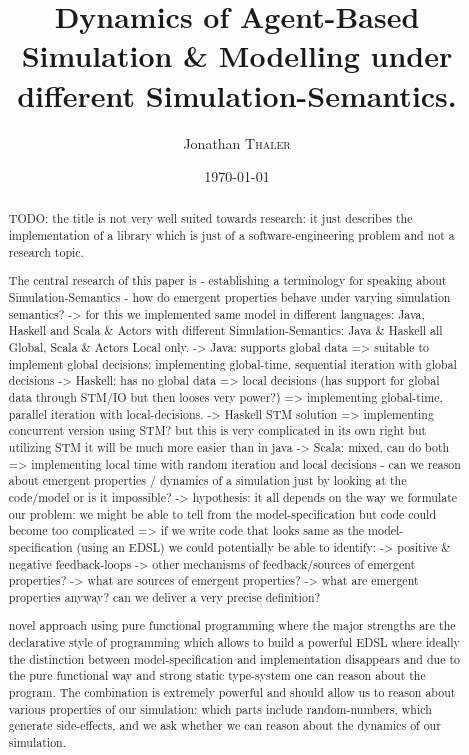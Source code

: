 \documentclass{article}
\title{Dynamics of Agent-Based Simulation \& Modelling under different Simulation-Semantics.} %
\author{Jonathan \textsc{Thaler}} %
\date{\today} %
\begin{document}
\maketitle %

\begin{abstract}
TODO: the title is not very well suited towards research: it just describes the implementation of a library which is just of a software-engineering problem and not a research topic.



The central research of this paper is
- establishing a terminology for speaking about Simulation-Semantics
- how do emergent properties behave under varying simulation semantics?
	-> for this we implemented same model in different languages: Java, Haskell and Scala & Actors with different Simulation-Semantics: Java & Haskell all Global, Scala & Actors Local only.
	-> Java: supports global data => suitable to implement global decisions: implementing global-time, sequential iteration with global decisions
	-> Haskell: has no global data => local decisions (has support for global data through STM/IO but then looses very power?) => implementing global-time, parallel iteration with local-decisions. 
		-> Haskell STM solution => implementing concurrent version using STM? but this is very complicated in its own right but utilizing STM it will be much more easier than in java
	-> Scala: mixed, can do both => implementing local time with random iteration and local decisions
- can we reason about emergent properties / dynamics of a simulation just by looking at the code/model or is it impossible?
	-> hypothesis: it all depends on the way we formulate our problem: we might be able to tell from the model-specification but code could become too complicated
		=> if we write code that looks same as the model-specification (using an EDSL) we could potentially be able to identify:
			-> positive & negative feedback-loops 
			-> other mechanisms of feedback/sources of emergent properties?
				-> what are sources of emergent properties?
					-> what are emergent properties anyway? can we deliver a very precise definition?

novel approach using pure functional programming where the major strengths are the declarative style of programming which allows to build a powerful EDSL where ideally the distinction between model-specification and implementation disappears and due to the pure functional way and strong static type-system one can reason about the program. The combination is extremely powerful and should allow us to reason about various properties of our simulation: which parts include random-numbers, which generate side-effects, and we ask whether we can reason about the dynamics of our simulation.





\end{abstract}
\end{document}
